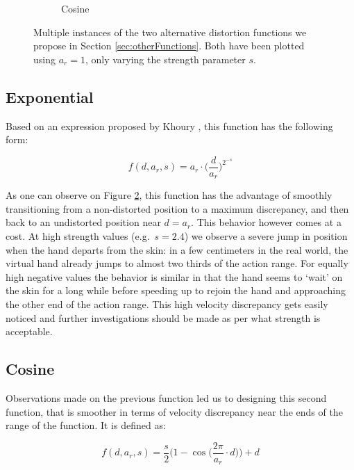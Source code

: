\begin{figure}[h]
\begin{subfigure}[b]{.45\textwidth}
        \caption{Cosine}
        \label{fig:otherDistortionsCos}
    \end{subfigure}
    \caption{Multiple instances of the two alternative distortion functions we propose in Section \ref{sec:otherFunctions}. Both have been plotted using $a_r = 1$, only varying the strength parameter $s$.}
    \label{fig:otherDistortions}
\end{figure}

\subsection*{Exponential}

Based on an expression proposed by Khoury \cite{khoury2015human}, this function has the following form:

\begin{equation*}
    f(d, a_r, s) = a_r \cdot \Bigg(\frac{d}{a_r}\Bigg)^{2^{-s}}
\end{equation*}

As one can observe on Figure \ref{fig:otherDistortions}, this function has the advantage of smoothly transitioning from a non-distorted position to a maximum discrepancy, and then back to an undistorted position near $d=a_r$. This behavior however comes at a cost. At high strength values (e.g.\ $s=2.4$) we observe a severe jump in position when the hand departs from the skin: in a few centimeters in the real world, the virtual hand already jumps to almost two thirds of the action range. For equally high negative values the behavior is similar in that the hand seems to `wait' on the skin for a long while before speeding up to rejoin the hand and approaching the other end of the action range. This high velocity discrepancy gets easily noticed and further investigations should be made as per what strength is acceptable.

\subsection*{Cosine}

Observations made on the previous function led us to designing this second function, that is smoother in terms of velocity discrepancy near the ends of the range of the function. It is defined as:

\begin{equation*}
    f(d, a_r, s) = \frac{s}{2}\Bigg(1 - \cos\Big(\frac{2\pi}{a_r} \cdot d\Big)\Bigg) + d
\end{equation*}

